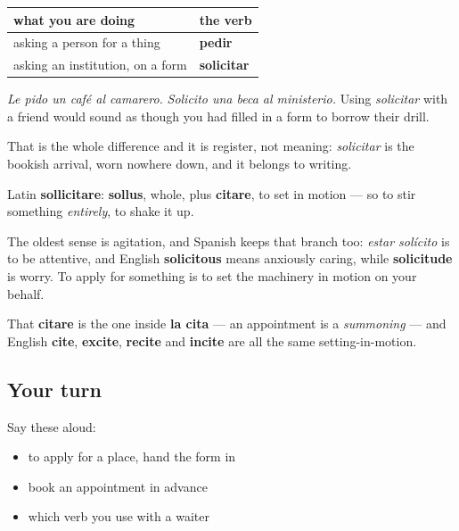 \begin{grammarlens}[title={Grammar Lens: solicitar is not pedir}]
\noindent
\begin{tabularx}{\linewidth}{@{}>{\raggedright\arraybackslash}X>{\raggedright\arraybackslash}X@{}}
\toprule
\textbf{what you are doing} & \textbf{the verb} \\
\midrule
asking a person for a thing & \textbf{pedir} \\
asking an institution, on a form & \textbf{solicitar} \\
\bottomrule
\end{tabularx}

\emph{Le pido un café al camarero.} \emph{Solicito una beca al ministerio.} Using \emph{solicitar} with a friend would sound as though you had filled in a form to borrow their drill.

That is the whole difference and it is register, not meaning: \emph{solicitar} is the bookish arrival, worn nowhere down, and it belongs to writing.
\end{grammarlens}

\begin{cousinweb}
Latin \textbf{sollicitare}: \textbf{sollus}, whole, plus \textbf{citare}, to set in motion — so to stir something \emph{entirely}, to shake it up.

The oldest sense is agitation, and Spanish keeps that branch too: \emph{estar solícito} is to be attentive, and English \textbf{solicitous} means anxiously caring, while \textbf{solicitude} is worry. To apply for something is to set the machinery in motion on your behalf.

That \textbf{citare} is the one inside \textbf{la cita} — an appointment is a \emph{summoning} — and English \textbf{cite}, \textbf{excite}, \textbf{recite} and \textbf{incite} are all the same setting-in-motion.
\end{cousinweb}

\subsection*{Your turn}
Say these aloud:

\begin{itemize}
\raggedright
  \item to apply for a place, hand the form in
  \item book an appointment in advance
  \item which verb you use with a waiter
\end{itemize}

